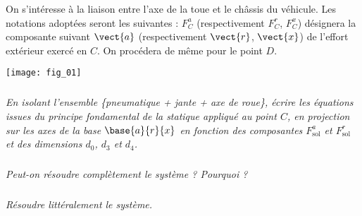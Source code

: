 \setcounter{exo}{0}

On s'intéresse à la liaison entre l'axe de la toue et le châssis du véhicule. Les notations adoptées seront les suivantes : $F^a_{C}$ (respectivement $F^r_{C}$, $F^x_{C}$) désignera la composante suivant $\vect{a}$ (respectivement $\vect{r}$, $\vect{x}$) de l'effort extérieur exercé en $C$. On procédera de même pour le point $D$. 
\begin{center}
\texttt{[image: fig\_01]}
\end{center}


\subparagraph{}\textit{En isolant l'ensemble \{pneumatique + jante + axe de roue\}, écrire les équations issues du principe fondamental de la statique appliqué au point $C$, en projection sur les axes de la base $\base{a}{r}{x}$ en fonction des composantes $F_{\text{sol}}^a$ et $F_{\text{sol}}^r$ et des dimensions $d_0$, $d_3$ et $d_4$.}

\subparagraph{}\textit{Peut-on résoudre complètement le système ? Pourquoi ?}

\subparagraph{}\textit{Résoudre littéralement le système.}